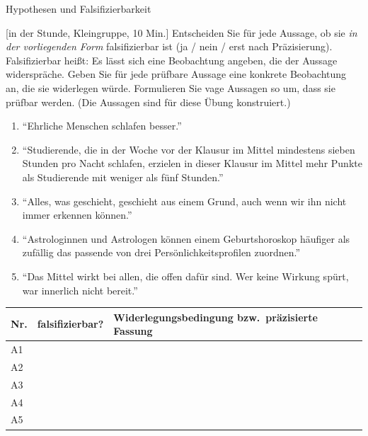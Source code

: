 \begin{uebungsblatt}{Hypothesen und Falsifizierbarkeit}

[in der Stunde, Kleingruppe, 10 Min.]
Entscheiden Sie für jede Aussage, ob sie \emph{in der vorliegenden Form}
falsifizierbar ist (ja / nein / erst nach Präzisierung). Falsifizierbar
heißt: Es lässt sich eine Beobachtung angeben, die der Aussage
widerspräche. Geben Sie für jede prüfbare Aussage eine konkrete
Beobachtung an, die sie widerlegen würde.
Formulieren Sie vage Aussagen so um, dass sie prüfbar werden. (Die
Aussagen sind für diese Übung konstruiert.)

\begin{enumerate}
  \item[A1] \enquote{Ehrliche Menschen schlafen besser.}
  \item[A2] \enquote{Studierende, die in der Woche vor der Klausur im
    Mittel mindestens sieben Stunden pro Nacht schlafen, erzielen in
    dieser Klausur im Mittel mehr Punkte als Studierende mit weniger als
    fünf Stunden.}
  \item[A3] \enquote{Alles, was geschieht, geschieht aus einem Grund, auch
    wenn wir ihn nicht immer erkennen können.}
  \item[A4] \enquote{Astrologinnen und Astrologen können einem
    Geburtshoroskop häufiger als zufällig das passende von drei
    Persönlichkeitsprofilen zuordnen.}
  \item[A5] \enquote{Das Mittel wirkt bei allen, die offen dafür sind.
    Wer keine Wirkung spürt, war innerlich nicht bereit.}
\end{enumerate}

\begin{center}
\renewcommand{\arraystretch}{2.4}
\begin{tabular}{|p{}|p{}|p{}|}
\hline
\textbf{Nr.} & \textbf{falsifizierbar?} & \textbf{Widerlegungsbedingung bzw.\ präzisierte Fassung} \\
\hline
A1 & & \\ \hline
A2 & & \\ \hline
A3 & & \\ \hline
A4 & & \\ \hline
A5 & & \\ \hline
\end{tabular}
\end{center}
\end{uebungsblatt}

